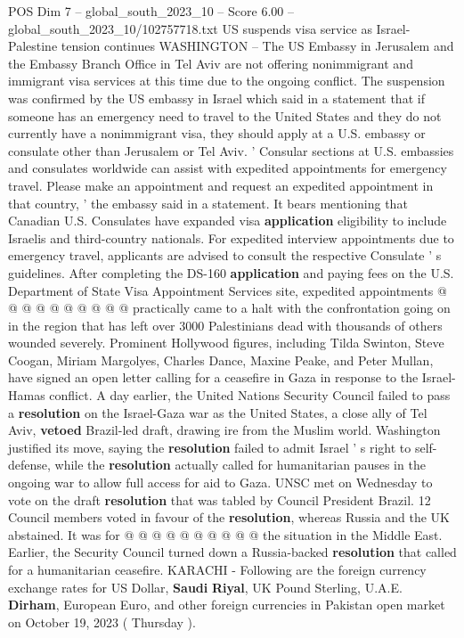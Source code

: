 \begin{textsample}{POS Dim 7 – global\_south\_2023\_10 – Score 6.00 – global\_south\_2023\_10/102757718.txt}  \label{ex:f7_pos_131}
US suspends visa service as Israel-Palestine tension continues WASHINGTON -- The US Embassy in Jerusalem and the Embassy Branch Office in Tel Aviv are not offering nonimmigrant and immigrant visa services at this time due to the ongoing conflict.
The suspension was confirmed by the US embassy in Israel which said in a statement that if someone has an emergency need to travel to the United States and they do not currently have a nonimmigrant visa, they should apply at a U.S. embassy or consulate other than Jerusalem or Tel Aviv. ' Consular sections at U.S. embassies and consulates worldwide can assist with expedited appointments for emergency travel.
Please make an appointment and request an expedited appointment in that country, ' the embassy said in a statement.
It bears mentioning that Canadian U.S.
Consulates have expanded visa \textbf{application} eligibility to include Israelis and third-country nationals.
For expedited interview appointments due to emergency travel, applicants are advised to consult the respective Consulate ' s guidelines.
After completing the DS-160 \textbf{application} and paying fees on the U.S.
Department of State Visa Appointment Services site, expedited appointments @ @ @ @ @ @ @ @ @ @ practically came to a halt with the confrontation going on in the region that has left over 3000 Palestinians dead with thousands of others wounded severely.
Prominent Hollywood figures, including Tilda Swinton, Steve Coogan, Miriam Margolyes, Charles Dance, Maxine Peake, and Peter Mullan, have signed an open letter calling for a ceasefire in Gaza in response to the Israel-Hamas conflict.
A day earlier, the United Nations Security Council failed to pass a \textbf{resolution} on the Israel-Gaza war as the United States, a close ally of Tel Aviv, \textbf{vetoed} Brazil-led draft, drawing ire from the Muslim world.
Washington justified its move, saying the \textbf{resolution} failed to admit Israel ' s right to self-defense, while the \textbf{resolution} actually called for humanitarian pauses in the ongoing war to allow full access for aid to Gaza.
UNSC met on Wednesday to vote on the draft \textbf{resolution} that was tabled by Council President Brazil. 12 Council members voted in favour of the \textbf{resolution}, whereas Russia and the UK abstained.
It was for @ @ @ @ @ @ @ @ @ @ the situation in the Middle East.
Earlier, the Security Council turned down a Russia-backed \textbf{resolution} that called for a humanitarian ceasefire.
KARACHI - Following are the foreign currency exchange rates for US Dollar, \textbf{Saudi} \textbf{Riyal}, UK Pound Sterling, U.A.E. \textbf{Dirham}, European Euro, and other foreign currencies in Pakistan open market on October 19, 2023 ( Thursday ).

\end{textsample}

